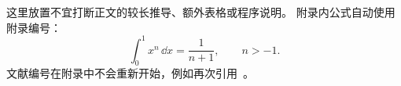 \label{app:derivation}
这里放置不宜打断正文的较长推导、额外表格或程序说明。
附录内公式自动使用附录编号：
\begin{equation}
 \int_0^1 x^n\,\dd x=\frac{1}{n+1},\qquad n>-1.
\end{equation}
文献编号在附录中不会重新开始，例如再次引用~\cite{Cowan2011}。
